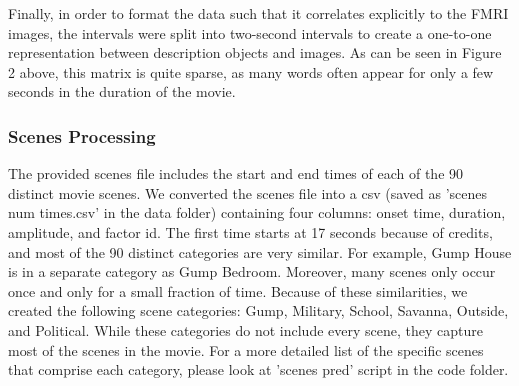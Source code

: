 Finally, in order to format the data such that it correlates explicitly
to the FMRI images, the intervals were split into two-second intervals
to create a one-to-one representation between description objects and images. As can be seen in Figure 2 above, this matrix is quite sparse, as many words often appear for only a few seconds in the duration of the movie. 

\subsubsection{Scenes Processing}
\par The provided scenes file includes the start and end times of each of the 90 distinct movie scenes. We converted the scenes file into a csv (saved as 'scenes num times.csv' in the data folder) containing four columns: onset time, duration, amplitude, and factor id. The first time starts at 17 seconds because of credits, and most of the 90 distinct categories are very similar. For example, Gump House is in a separate category as Gump Bedroom. Moreover, many scenes only occur once and only for a small fraction of time. Because of these similarities, we created the following scene categories: Gump, Military, School, Savanna, Outside, and Political. While these categories do not include every scene, they capture most of the scenes in the movie. For a more detailed list of the specific scenes that comprise each category, please look at 'scenes pred' script in the code folder.  
